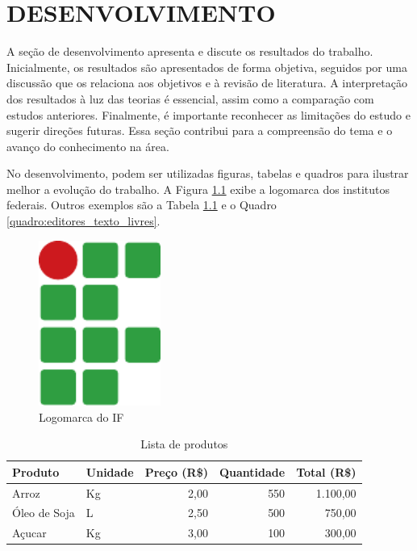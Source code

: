 \documentclass{iftex2024}
\begin{document}
\chapter{DESENVOLVIMENTO}

A seção de desenvolvimento apresenta e discute os resultados do trabalho.
Inicialmente, os resultados são apresentados de forma objetiva, seguidos por uma discussão que os relaciona aos objetivos e à revisão de literatura.
A interpretação dos resultados à luz das teorias é essencial, assim como a comparação com estudos anteriores.
Finalmente, é importante reconhecer as limitações do estudo e sugerir direções futuras.
Essa seção contribui para a compreensão do tema e o avanço do conhecimento na área.

No desenvolvimento, podem ser utilizadas figuras, tabelas e quadros para ilustrar melhor a evolução do trabalho.
A Figura \ref{figura:logomarca_if} exibe a logomarca dos institutos federais.
Outros exemplos são a Tabela \ref{tabela:lista_produtos} e o Quadro \ref{quadro:editores_texto_livres}.

\begin{figure}[!htb] \centering
  \caption{Logomarca do IF} \label{figura:logomarca_if}
  \begin{varwidth}{\linewidth}
    \includegraphics[width=4cm]{figuras/if}
  \end{varwidth}
\end{figure}

\begin{table}[!htb]
\caption{Lista de produtos} \label{tabela:lista_produtos}
\begin{tabularx}{\textwidth}{X|l|r|r|r} \hline
Produto      & Unidade & Preço (R\$) & Quantidade & Total (R\$) \\ \hline
Arroz        & Kg      & 2,00        & 550        & 1.100,00    \\
Óleo de Soja & L       & 2,50        & 500        & 750,00      \\
Açucar       & Kg      & 3,00        & 100        & 300,00      \\ \hline
\end{tabularx}
\end{table}
\end{document}
